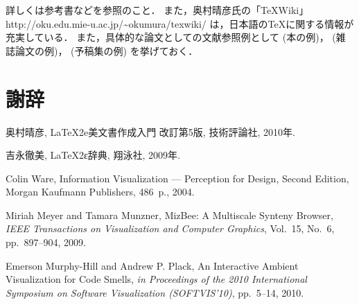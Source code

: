\documentclass[a4paper,11pt]{ujreport}
\begin{document}
詳しくは参考書\cite{okumura2010,yoshinaga2009}などを参照のこと．
また，奥村晴彦氏の「\TeX Wiki」
http://oku.edu.mie-u.ac.jp/\textasciitilde{}okumura/texwiki/
は，日本語の\TeX に関する情報が充実している．
また，具体的な論文としての文献参照例として
(本の例)\cite{ware2004}，
(雑誌論文の例)\cite{meyer2009}，
(予稿集の例)\cite{hill2010}
を挙げておく．

\chapter*{謝辞}

\newpage

\renewcommand{\bibname}{参考文献}

%
%

\begin{thebibliography}{1}
奥村晴彦, LaTeX2e美文書作成入門 改訂第5版, 技術評論社, 2010年.

吉永徹美, LaTeX2ε辞典, 翔泳社, 2009年.

Colin Ware, Information Visualization --- Perception for Design, Second Edition, Morgan Kaufmann Publishers, 486~p., 2004.

Miriah Meyer and Tamara Munzner, MizBee: A Multiscale Synteny Browser, {\em IEEE Transactions on Visualization and Computer Graphics}, Vol.~15, No.~6, pp.~897--904, 2009.

Emerson Murphy-Hill and Andrew P. Plack, An Interactive Ambient Visualization for Code Smells, {\em in Proceedings of the 2010 International Symposium on Software Visualization (SOFTVIS’10)}, pp.~5--14, 2010.

\end{thebibliography}
\end{document}

